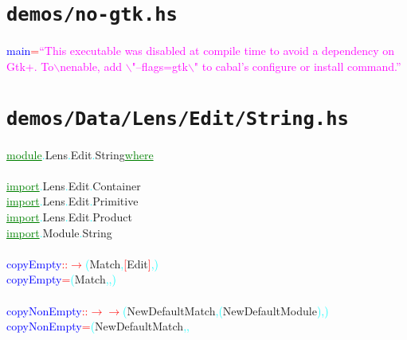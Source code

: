 \section{\texttt{demos/no-gtk.hs}}
\label{mod:no-gtk}
\textcolor{blue}{main}\hsspace \textcolor{red}{=}\hsspace \textcolor{magenta}{``This executable was disabled at compile time to avoid a dependency on Gtk+. To$\backslash$nenable, add $\backslash$"--flags=gtk$\backslash$" to cabal's configure or install command.''}\\
\section{\texttt{demos/Data/Lens/Edit/String.hs}}
\label{mod:Data.Lens.Edit.String}
\textcolor{green}{\underline{module}}\textcolor{cyan}{.}{\rm{}Lens}\textcolor{cyan}{.}{\rm{}Edit}\textcolor{cyan}{.}{\rm{}String}\hsspace \textcolor{green}{\underline{where}}\\\\\textcolor{green}{\underline{import}}\textcolor{cyan}{.}{\rm{}Lens}\textcolor{cyan}{.}{\rm{}Edit}\textcolor{cyan}{.}{\rm{}Container}\\\textcolor{green}{\underline{import}}\textcolor{cyan}{.}{\rm{}Lens}\textcolor{cyan}{.}{\rm{}Edit}\textcolor{cyan}{.}{\rm{}Primitive}\\\textcolor{green}{\underline{import}}\textcolor{cyan}{.}{\rm{}Lens}\textcolor{cyan}{.}{\rm{}Edit}\textcolor{cyan}{.}{\rm{}Product}\\\textcolor{green}{\underline{import}}\textcolor{cyan}{.}{\rm{}Module}\textcolor{cyan}{.}{\rm{}String}\\\\\textcolor{blue}{copyEmpty}\hsspace \textcolor{red}{::}\hsspace \textcolor{red}{\ensuremath{\rightarrow}}\hsspace \textcolor{cyan}{(}{\rm{}Match}\textcolor{cyan}{,}\hsspace \textcolor{red}{[}{\rm{}Edit}\textcolor{red}{]}\textcolor{cyan}{,}\textcolor{cyan}{)}\\\textcolor{blue}{copyEmpty}\hsspace \textcolor{red}{=}\hsspace \textcolor{cyan}{(}{\rm{}Match}\textcolor{cyan}{,}\textcolor{cyan}{,}\textcolor{cyan}{)}\\\\\textcolor{blue}{copyNonEmpty}\hsspace \textcolor{red}{::}\hsspace \textcolor{red}{\ensuremath{\rightarrow}}\hsspace \textcolor{red}{\ensuremath{\rightarrow}}\hsspace \textcolor{cyan}{(}{\rm{}NewDefaultMatch}\textcolor{cyan}{,}\hsspace \textcolor{cyan}{(}{\rm{}NewDefaultModule}\textcolor{cyan}{)}\textcolor{cyan}{,}\textcolor{cyan}{)}\\\textcolor{blue}{copyNonEmpty}\hsspace \textcolor{red}{=}\hsspace \textcolor{cyan}{(}{\rm{}NewDefaultMatch}\textcolor{cyan}{,}\textcolor{cyan}{,}\hsspace 